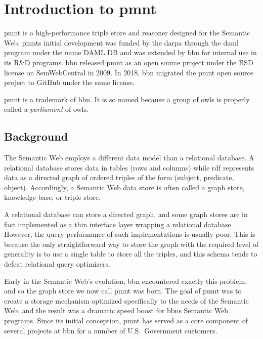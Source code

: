 
\chapter{Introduction to \acl{pmnt}}

\acl{pmnt} is a high-performance triple store and reasoner designed for the Semantic Web.  \acp{pmnt} initial development was funded by the \ac{darpa} through the \ac{daml} program under the name DAML DB and was extended by \ac{bbn} for internal use in its R\&D programs.  \ac{bbn} released \ac{pmnt} as an open source project under the BSD license on SemWebCentral in 2009.  In 2018, \ac{bbn} migrated the \ac{pmnt} open source project to GitHub under the same license.

\acl{pmnt} is a trademark of \acl{bbn}.  It is so named because a group of owls is properly called a \emph{parliament} of owls.

\section{Background}

The Semantic Web employs a different data model than a relational database.  A relational database stores data in tables (rows and columns) while \ac{rdf} represents data as a directed graph of ordered triples of the form (subject, predicate, object).  Accordingly, a Semantic Web data store is often called a graph store, knowledge base, or triple store.

A relational database can store a directed graph, and some graph stores are in fact implemented as a thin interface layer wrapping a relational database.  However, the query performance of such implementations is usually poor.  This is because the only straightforward way to store the graph with the required level of generality is to use a single table to store all the triples, and this schema tends to defeat relational query optimizers.

Early in the Semantic Web's evolution, \ac{bbn} encountered exactly this problem, and so the graph store we now call \ac{pmnt} was born.  The goal of \ac{pmnt} was to create a storage mechanism optimized specifically to the needs of the Semantic Web, and the result was a dramatic speed boost for \acp{bbn} Semantic Web programs.  Since its initial conception, \ac{pmnt} has served as a core component of several projects at \ac{bbn} for a number of U.S.\ Government customers.

